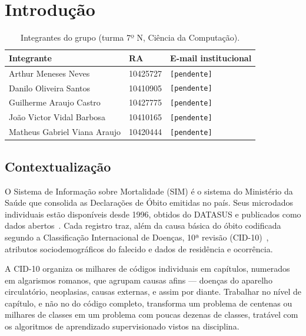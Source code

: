 \documentclass[12pt]{article}
\begin{document}
\section{Introdução}

\begin{table}[ht]
\centering
\caption{Integrantes do grupo (turma 7º N, Ciência da Computação).}
\label{tab:integrantes}
\begin{tabular}{|l|l|l|}
\hline
\textbf{Integrante} & \textbf{RA} & \textbf{E-mail institucional} \\
\hline
Arthur Meneses Neves         & 10425727 & \texttt{[pendente]} \\
Danilo Oliveira Santos       & 10410905 & \texttt{[pendente]} \\
Guilherme Araujo Castro      & 10427775 & \texttt{[pendente]} \\
João Victor Vidal Barbosa    & 10410165 & \texttt{[pendente]} \\
Matheus Gabriel Viana Araujo & 10420444 & \texttt{[pendente]} \\
\hline
\end{tabular}
\end{table}

\subsection{Contextualização}

O Sistema de Informação sobre Mortalidade (SIM) é o sistema do Ministério da
Saúde que consolida as Declarações de Óbito emitidas no país. Seus microdados
individuais estão disponíveis desde 1996, obtidos do DATASUS e publicados como
dados abertos~\cite{pcdas_sim,sim_dadosgov}. Cada registro traz, além da causa
básica do óbito codificada segundo a Classificação Internacional de Doenças,
10ª revisão (CID-10)~\cite{who_cid10}, atributos sociodemográficos do falecido
e dados de residência e ocorrência.

A CID-10 organiza os milhares de códigos individuais em capítulos, numerados
em algarismos romanos, que agrupam causas afins --- doenças do aparelho
circulatório, neoplasias, causas externas, e assim por diante. Trabalhar no
nível de capítulo, e não no do código completo, transforma um problema de
centenas ou milhares de classes em um problema com poucas dezenas de classes,
tratável com os algoritmos de aprendizado supervisionado vistos na disciplina.
\end{document}
